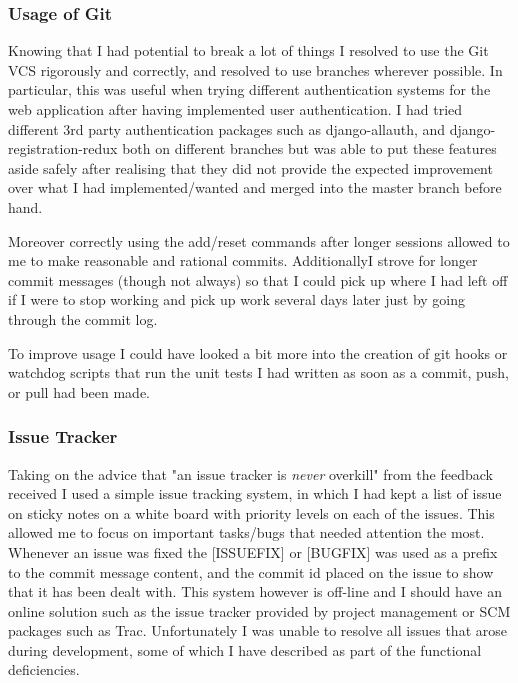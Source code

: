 \documentclass[11pt,a4paper]{article}
\begin{document}
\subsubsection{Usage of Git}
Knowing that I had potential to break a lot of things I resolved to use the Git VCS rigorously and correctly, and resolved to use branches wherever possible. In particular, this was useful when trying different authentication systems for the web application after having implemented user authentication. I had tried different 3rd party authentication packages such as django-allauth, and django-registration-redux both on different branches but was able to put these features aside safely after realising that they did not provide the expected improvement over what I had implemented/wanted and merged into the master branch before hand.

Moreover correctly using the add/reset commands after longer sessions allowed to me to make reasonable and rational commits. AdditionallyI strove for longer commit messages (though not always) so that I could pick up where I had left off if I were to stop working and pick up work several days later just by going through the commit log.

To improve usage I could have looked a bit more into the creation of git hooks or watchdog scripts that run the unit tests I had written as soon as a commit, push, or pull had been made.

\subsubsection{Issue Tracker}
Taking on the advice that "an issue tracker is \textit{never} overkill" from the feedback received I used a simple issue tracking system, in which I had kept a list of issue on sticky notes on a white board with priority levels on each of the issues. This allowed me to focus on important tasks/bugs that needed attention the most. Whenever an issue was fixed the [ISSUEFIX] or [BUGFIX] was used as a prefix to the commit message content, and the commit id placed on the issue to show that it has been dealt with. This system however is off-line and I should have an online solution such as the issue tracker provided by project management or SCM packages such as Trac. Unfortunately I was unable to resolve all issues that arose during development, some of which I have described as part of the functional deficiencies. 
\end{document}
